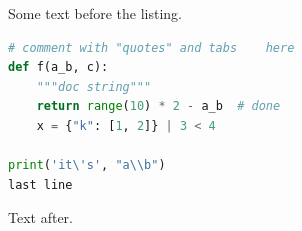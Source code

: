 \documentclass{article}
\begin{document}
Some text before the listing.
\begin{lstlisting}[language=Python,columns=flexible,showstringspaces=false]
# comment with "quotes" and tabs	here
def f(a_b, c):
    """doc string"""
    return range(10) * 2 - a_b  # done
  	x = {"k": [1, 2]} | 3 < 4

print('it\'s', "a\\b")   
last line
\end{lstlisting}
Text after.
\end{document}
